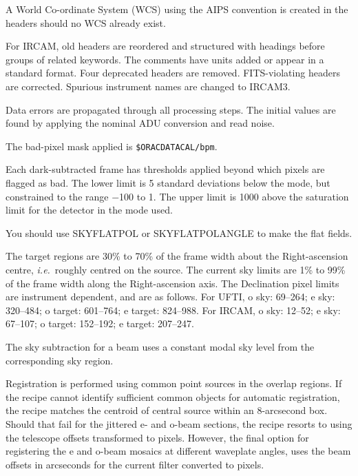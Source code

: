 \documentclass[twoside,11pt]{article}
\newcommand{\htmlref}[2]{#1}
\renewcommand{\_}{\texttt{\symbol{95}}}
\newcommand{\sstitem}{\item}
\begin{document}
{{{         \sstitem
         A World Co-ordinate System (WCS) using the AIPS convention is
         created in the headers should no WCS already exist.

         \sstitem
         For IRCAM, old headers are reordered and structured with
         headings before groups of related keywords.  The comments have
         units added or appear in a standard format.  Four deprecated
         headers are removed.  FITS-violating headers are corrected.
         Spurious instrument names are changed to IRCAM3.

         \sstitem
         Data errors are propagated through all processing steps.
         The initial values are found by applying the nominal ADU conversion
         and read noise.

         \sstitem
         The bad-pixel mask applied is {\tt\$ORAC\_DATA\_CAL/bpm}.

         \sstitem
         Each dark-subtracted frame has thresholds applied beyond which
         pixels are flagged as bad.  The lower limit is 5 standard
         deviations below the mode, but constrained to the range $-$100 to 1.
         The upper limit is 1000 above the saturation limit for the detector
         in the mode used.

         \sstitem
         You should use \htmlref{SKY\_FLAT\_POL}{SKY\_FLAT\_POL} or
         \htmlref{SKY\_FLAT\_POL\_ANGLE}{SKY\_FLAT\_POL\_ANGLE} to make the
         flat fields.

         \sstitem
         The target regions are 30\% to 70\% of the frame width about
         the Right-ascension centre, {\em{i.e.}}\ roughly centred on the source.
         The current sky limits are 1\% to 99\% of the frame width along the
         Right-ascension axis.  The Declination pixel limits are instrument
         dependent, and are as follows.  For UFTI, o sky: 69--264;
         e sky: 320--484; o target: 601--764; e target: 824--988.  For
         IRCAM, o sky: 12--52; e sky: 67--107; o target: 152--192;
         e target: 207--247.

         \sstitem
         The sky subtraction for a beam uses a constant modal sky level
         from the corresponding sky region.

         \sstitem
         Registration is performed using common point sources in the
         overlap regions.  If the recipe cannot identify sufficient common
         objects for automatic registration, the recipe matches the centroid
         of central source within an 8-arcsecond box.  Should that fail for
         the jittered e- and o-beam sections, the recipe resorts to using the
         telescope offsets transformed to pixels.  However, the final option
         for registering the e and o-beam mosaics at different waveplate
         angles, uses the beam offsets in arcseconds for the current filter
         converted to pixels.

}}}
\end{document}

